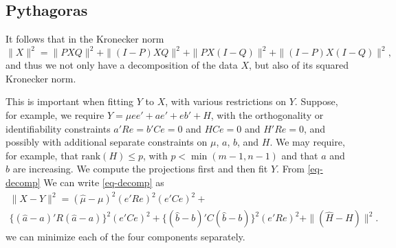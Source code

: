 \documentclass[
  12pt,
  letterpaper,
  DIV=11,
  numbers=noendperiod]{scrartcl}
\begin{document}
\subsection{Pythagoras}\label{pythagoras}

It follows that in the Kronecker norm \begin{equation}
\|X\|^2=\|PXQ\|^2+\|(I-P)XQ\|^2+\|PX(I-Q)\|^2+\|(I-P)X(I-Q)\|^2,\label{eq-decomp}
\end{equation} and thus we not only have a decomposition of the data
\(X\), but also of its squared Kronecker norm.

This is important when fitting \(Y\) to \(X\), with various restrictions
on \(Y\). Suppose, for example, we require \(Y=\mu ee'+ae'+eb'+H\), with
the orthogonality or identifiability constraints \(a'Re=b'Ce=0\) and
\(HCe=0\) and \(H'Re=0\), and possibly with additional separate
constraints on \(\mu\), \(a\), \(b\), and \(H\). We may require, for
example, that \(\text{rank}(H)\leq p\), with \(p<\min(m-1,n-1)\) and
that \(a\) and \(b\) are increasing. We compute the projections first
and then fit \(Y\). From \eqref{eq-decomp} We can write
\eqref{eq-decomp} as \begin{multline}
\|X-Y\|^2=(\hat\mu-\mu)^2(e'Re)^2(e'Ce)^2+\\\{(\hat a-a)'R(\hat a-a)\}^2(e'Ce)^2+\{(\hat b-b)'C(\hat b-b)\}^2(e'Re)^2+\|(\hat H-H)\|^2.
\end{multline} we can minimize each of the four components separately.
\end{document}
